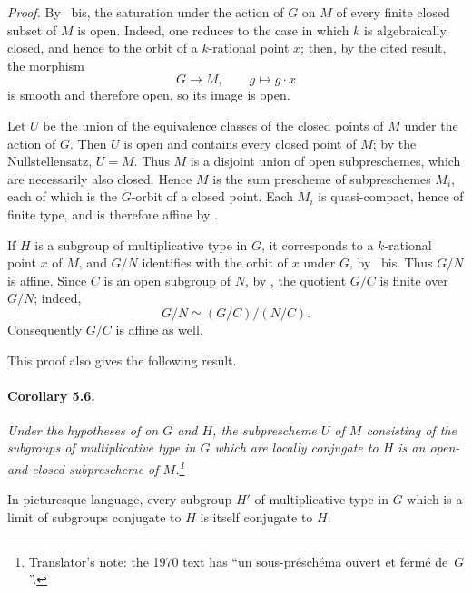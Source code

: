 \emph{Proof.}
By ~bis, the saturation under the action of \(G\) on \(M\) of
every finite closed subset of \(M\) is open. Indeed, one reduces to
the case in which \(k\) is algebraically closed, and hence to the
orbit of a \(k\)-rational point \(x\); then, by the cited result, the
morphism
\[
  G\longrightarrow M,\qquad g\longmapsto g\cdot x
\]
is smooth and therefore open, so its image is open.

Let \(U\) be the union of the equivalence classes of the closed
points of \(M\) under the action of \(G\). Then \(U\) is open and
contains every closed point of \(M\); by the Nullstellensatz,
\(U=M\). Thus \(M\) is a disjoint union of open subpreschemes, which
are necessarily also closed. Hence \(M\) is the sum prescheme of
subpreschemes \(M_i\), each of which is the \(G\)-orbit of a closed
point. Each \(M_i\) is quasi-compact, hence of finite type, and is
therefore affine by .

If \(H\) is a subgroup of multiplicative type in \(G\), it
corresponds to a \(k\)-rational point \(x\) of \(M\), and \(G/N\)
identifies with the orbit of \(x\) under \(G\), by ~bis. Thus
\(G/N\) is affine. Since \(C\) is an open subgroup of \(N\), by
, the quotient \(G/C\) is finite over \(G/N\); indeed,
\[
  G/N\simeq (G/C)/(N/C).
\]
Consequently \(G/C\) is affine as well.

This proof also gives the following result.

\paragraph{\textbf{Corollary 5.6.}}
\emph{Under the hypotheses of  on \(G\) and \(H\), the
subprescheme \(U\) of \(M\) consisting of the subgroups of
multiplicative type in \(G\) which are locally conjugate to \(H\)
is an open-and-closed subprescheme of \(M\).\footnote{Translator's note:
the 1970 text has ``un sous-préschéma ouvert et fermé de~\(G\)''.}}

In picturesque language, every subgroup \(H'\) of multiplicative
type in \(G\) which is a limit of subgroups conjugate to \(H\) is
itself conjugate to \(H\).

